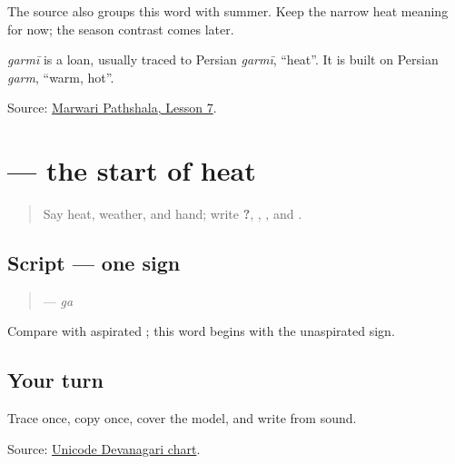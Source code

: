 The source also groups this word with summer. Keep the narrow heat meaning for now; the season contrast comes later.

\begin{cousinweb}
\emph{garmī} is a loan, usually traced to Persian \emph{garmī}, \textquotedblleft{}heat\textquotedblright{}. It is built on Persian \emph{garm}, \textquotedblleft{}warm, hot\textquotedblright{}.
\end{cousinweb}

\begin{tcolorbox}[breakable,colback=teal!4,colframe=teal!35!black,title={Before you move on}]
Source: \href{https://www.marwaripathshala.com/marwari-lesson-7-english}{Marwari Pathshala, Lesson 7}.
\end{tcolorbox}
\section[\texorpdfstring{\mw{ग} (ga)}{ग (ga)}]{ — the start of heat}

\label{lesson:MW-W12-ga}



\begin{quote}
Say heat, weather, and hand; write \textbf{  ?}, \textbf{}, \textbf{}, and \textbf{}.
\end{quote}

\subsection*{Script — one sign}

\begin{quote}
\textbf{} — \emph{ga}
\end{quote}

Compare \textbf{} with aspirated \textbf{}; this word begins with the unaspirated sign.

\subsection*{Your turn}
Trace once, copy once, cover the model, and write \textbf{} from sound.

\begin{tcolorbox}[breakable,colback=teal!4,colframe=teal!35!black,title={Before you move on}]
Source: \href{https://www.unicode.org/charts/PDF/U0900.pdf}{Unicode Devanagari chart}.
\end{tcolorbox}
